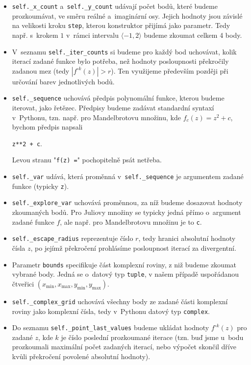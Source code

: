 \begin{itemize}
    \item \texttt{self.\_x\_count} a~\texttt{self.\_y\_count} udávají počet bodů, které budeme prozkoumávat, ve směru reálné a~imaginární osy. Jejich hodnoty jsou závislé na velikosti kroku \texttt{step}, kterou konstruktor přijímá jako parametr. Tedy např. s~krokem $1$ v~rámci intervalu $\langle-1,2\rangle$ budeme zkoumat celkem 4 body.
    \item V~seznamu \texttt{self.\_iter\_counts} si budeme pro každý bod uchovávat, kolik iterací zadané funkce bylo potřeba, než hodnoty posloupnosti překročily zadanou mez (tedy $|f^{\circ k}(z)|>r$). Ten využijeme především později při určování barev jednotlivých bodů.
    \item \texttt{self.\_sequence} uchovává předpis polynomální funkce, kterou budeme iterovat, jako řetězec. Předpisy budeme zadávat standardní syntaxí v~Pythonu, tzn. např. pro Mandelbrotovu množinu, kde $f_c(z)=z^2+c$, bychom předpis napsali
    \begin{center}
        \texttt{z**2 + c}.
    \end{center}
    Levou stranu "\texttt{f(z) =}" pochopitelně psát netřeba.
    \item \texttt{self.\_var} udává, která proměnná v~\texttt{self.\_sequence} je argumentem zadané funkce (typicky \texttt{z}).
    \item \texttt{self.\_explore\_var} uchovává proměnnou, za níž budeme dosazovat hodnoty zkoumaných bodů. Pro Juliovy množiny se typicky jedná přímo o~argument zadané funkce $f$, ale např. pro Mandelbrotovu množinu je to \texttt{c}.
    \item \texttt{self.\_escape\_radius} reprezentuje číslo $r$, tedy hranici absolutní hodnoty čísla $z$, po jejímž překročení prohlásíme posloupnost iterací za divergentní.
    \item Parametr \texttt{bounds} specifikuje část komplexní roviny, z niž budeme zkoumat vybrané body. Jedná se o~datový typ \texttt{tuple}, v našem případě uspořádanou čtveřici $(x_{\text{min}},x_{\text{max}},y_{\text{min}},y_{\text{max}})$.
    \item \texttt{self.\_complex\_grid} uchovává všechny body ze zadané části komplexní roviny jako komplexní čísla, tedy v~Pythonu datový typ \texttt{complex}.
    \item Do seznamu \texttt{self.\_point\_last\_values} budeme ukládat hodnoty $f^{\circ k}(z)$ pro zadané $z$, kde $k$ je číslo poslední prozkoumané iterace (tzn. buď jsme u~bodu prozkoumali maximální počet zadaných iterací, nebo výpočet skončil dříve kvůli překročení povolené absolutní hodnoty).
\end{itemize}

